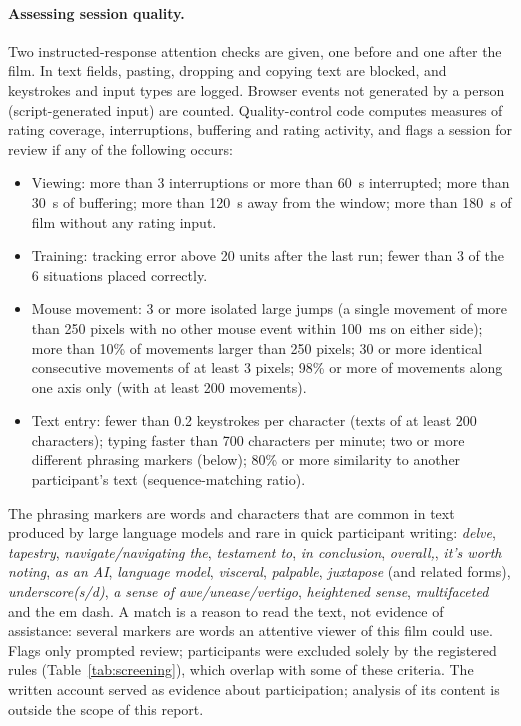 \documentclass[11pt,a4paper]{article}
\begin{document}
\paragraph{Assessing session quality.} Two instructed-response attention checks are given, one before and one after
the film. In text fields, pasting, dropping and copying text are blocked, and keystrokes and input types are logged.
Browser events not generated by a person (script-generated input) are counted. Quality-control code computes measures
of rating coverage, interruptions, buffering and rating activity, and flags a session for review if any of the
following occurs:
\begin{itemize}\setlength{\itemsep}{0pt}
\item Viewing: more than 3 interruptions or more than 60~s interrupted; more than 30~s of buffering; more than 120~s
  away from the window; more than 180~s of film without any rating input.
\item Training: tracking error above 20 units after the last run; fewer than 3 of the 6 situations placed correctly.
\item Mouse movement: 3 or more isolated large jumps (a single movement of more than 250 pixels with no other mouse
  event within 100~ms on either side); more than 10\% of movements larger than 250 pixels; 30 or more identical
  consecutive movements of at least 3 pixels; 98\% or more of movements along one axis only (with at least 200
  movements).
\item Text entry: fewer than 0.2 keystrokes per character (texts of at least 200 characters); typing faster than 700
  characters per minute; two or more different phrasing markers (below); 80\% or more similarity to another
  participant's text (sequence-matching ratio).
\end{itemize}
The phrasing markers are words and characters that are common in text produced by large language models and rare in
quick participant writing: \textit{delve}, \textit{tapestry}, \textit{navigate/navigating the}, \textit{testament
to}, \textit{in conclusion}, \textit{overall,}, \textit{it's worth noting}, \textit{as an AI}, \textit{language model},
\textit{visceral}, \textit{palpable}, \textit{juxtapose} (and related forms), \textit{underscore(s/d)}, \textit{a
sense of awe/unease/vertigo}, \textit{heightened sense}, \textit{multifaceted} and the em dash. A match is a reason to
read the text, not evidence of assistance: several markers are words an attentive viewer of this film could use.
Flags only prompted review; participants were excluded solely by the registered rules (Table~\ref{tab:screening}), which overlap with
some of these criteria. The written account served as evidence about participation; analysis of its content is outside
the scope of this report.
\end{document}
